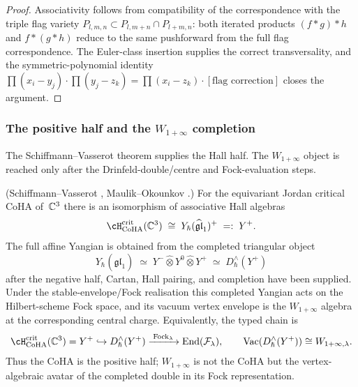 \begin{proof}
Associativity follows from compatibility of the correspondence with
the triple flag variety
$P_{l,m,n} \subset P_{l,m+n} \cap P_{l+m,n}$: both iterated products
$(f * g) * h$ and $f * (g * h)$ reduce to the same pushforward from
the full flag correspondence. The Euler-class insertion supplies the
correct transversality, and the symmetric-polynomial identity
$\prod(x_i - y_j) \cdot \prod(y_j - z_k) =
\prod(x_i - z_k) \cdot [\text{flag correction}]$
closes the argument.
\end{proof}

\subsubsection{The positive half and the $W_{1+\infty}$ completion}
\label{subsubsec:coha-w1infty}

The Schiffmann--Vasserot theorem supplies the Hall half. The
$W_{1+\infty}$ object is reached only after the Drinfeld-double/centre
and Fock-evaluation steps.

\begin{theorem}
\label{thm:sv-coha-w}
\textup{(Schiffmann--Vasserot \cite{SV13}, Maulik--Okounkov
\cite{MO19}.)}
For the equivariant Jordan critical CoHA of~$\mathbb C^3$ there is an
isomorphism of associative Hall algebras
\[
 \cH_{\mathrm{CoHA}}^{\mathrm{crit}}(\CC^3)
 \;\cong\;
 Y_\hbar(\widehat{\mathfrak{gl}}_1)^+
 \;=:\;Y^+ .
\]
The full affine Yangian is obtained from the completed triangular
object
\[
 Y_\hbar(\widehat{\mathfrak{gl}}_1)
 \;\simeq\;
 Y^-\widehat\otimes Y^0\widehat\otimes Y^+
 \;\simeq\; D_\hbar^\wedge(Y^+)
\]
after the negative half, Cartan, Hall pairing, and completion have been
supplied. Under the stable-envelope/Fock realisation this completed
Yangian acts on the Hilbert-scheme Fock space, and its vacuum vertex
envelope is the $W_{1+\infty}$ algebra at the corresponding central
charge. Equivalently, the typed chain is
\[
 \cH_{\mathrm{CoHA}}^{\mathrm{crit}}(\CC^3)=Y^+
 \hookrightarrow
 D_\hbar^\wedge(Y^+)
 \xrightarrow{\;\mathrm{Fock}_\lambda\;}
 \End(\mathcal F_\lambda),
\qquad
 \mathrm{Vac}(D_\hbar^\wedge(Y^+))\cong W_{1+\infty,\lambda}.
\]
Thus the CoHA is the positive half; $W_{1+\infty}$ is not the CoHA but
the vertex-algebraic avatar of the completed double in its Fock
representation.
\end{theorem}

